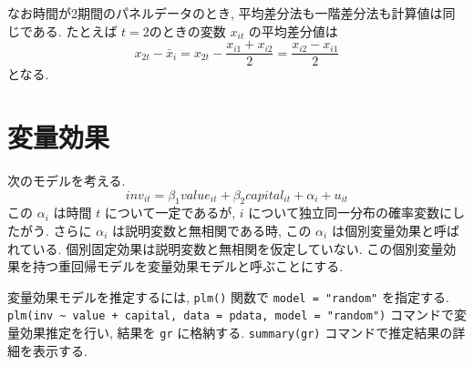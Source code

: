 \documentclass[
  letterpaper,
  xelatex,
  ja=standard, xelatex]{bxjsbook}
\begin{document}
なお時間が2期間のパネルデータのとき,
平均差分法も一階差分法も計算値は同じである. たとえば \(t=2\)のときの変数
\(x_{it}\) の平均差分値は \[
x_{2t}-\bar{x}_i=x_{2t}-\frac{x_{i1}+x_{i2}}{2}=\frac{x_{i2}-x_{i1}}{2}
\] となる.

\section{変量効果}\label{ux5909ux91cfux52b9ux679c}

次のモデルを考える. \[
inv_{it} = \beta_1 value_{it} + \beta_2 capital_{it} +\alpha_i + u_{it}
\] この \(\alpha_i\) は時間 \(t\) について一定であるが, \(i\)
について独立同一分布の確率変数にしたがう. さらに \(\alpha_i\)
は説明変数と無相関である時, この \(\alpha_i\)
は個別変量効果と呼ばれている.
個別固定効果は説明変数と無相関を仮定していない.
この個別変量効果を持つ重回帰モデルを変量効果モデルと呼ぶことにする.

変量効果モデルを推定するには, \texttt{plm()} 関数で
\texttt{model\ =\ "random"} を指定する.
\texttt{plm(inv\ \textasciitilde{}\ value\ +\ capital,\ data\ =\ pdata,\ model\ =\ "random")}
コマンドで変量効果推定を行い, 結果を \texttt{gr} に格納する.
\texttt{summary(gr)} コマンドで推定結果の詳細を表示する.
\end{document}
